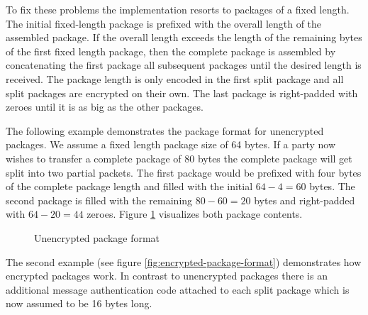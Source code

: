 To fix these problems the implementation resorts to packages of a fixed length.
The initial fixed-length package is prefixed with the overall length of the assembled package.
If the overall length exceeds the length of the remaining bytes of the first fixed length package, then the complete package is assembled by concatenating the first package all subsequent packages until the desired length is received.
The package length is only encoded in the first split package and all split packages are encrypted on their own.
The last package is right-padded with zeroes until it is as big as the other packages.

The following example demonstrates the package format for unencrypted packages.
We assume a fixed length package size of 64 bytes.
If a party now wishes to transfer a complete package of 80 bytes the complete package will get split into two partial packets.
The first package would be prefixed with four bytes of the complete package length and filled with the initial $64 - 4 = 60$ bytes.
The second package is filled with the remaining $80 - 60 = 20$ bytes and right-padded with $64 - 20 = 44$ zeroes.
Figure \ref{fig:unencrypted-package-format} visualizes both package contents.

\begin{figure}
    \center


    \caption{Unencrypted package format}
    \label{fig:unencrypted-package-format}
\end{figure}

The second example (see figure \ref{fig:encrypted-package-format}) demonstrates how encrypted packages work.
In contrast to unencrypted packages there is an additional message authentication code attached to each split package which is now assumed to be 16 bytes long.

